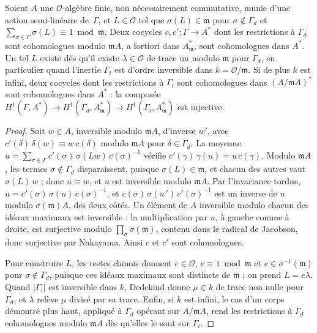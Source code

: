 \begin{encadre}
\begin{enonce}
Soient $A$ une $\mathcal O$-algèbre finie, non nécessairement commutative, munie d'une action semi-linéaire de~$\Gamma$, et $L \in \mathcal O$ tel que $\sigma(L) \in \mathfrak m$ pour $\sigma \notin \Gamma_d$ et $\sum_{\sigma \in \Gamma} \sigma(L) \equiv 1 \bmod \mathfrak m$. Deux cocycles $c, c' : \Gamma \to A^*$ dont les restrictions à $\Gamma_d$ sont cohomologues modulo $\mathfrak mA$, a fortiori dans $A_{\mathfrak m}^*$, sont cohomologues dans $A^*$. Un tel $L$ existe dès qu'il existe $\lambda \in \mathcal O$ de trace un modulo $\mathfrak m$ pour $\Gamma_d$, en particulier quand l'inertie $\Gamma_i$ est d'ordre inversible dans $k = \mathcal O/\mathfrak m$. Si de plus $k$ est infini, deux cocycles dont les restrictions à $\Gamma_i$ sont cohomologues dans $(A/\mathfrak mA)^*$ sont cohomologues dans $A^*$ : la composée $H^1(\Gamma, A^*) \to H^1(\Gamma_d, A_{\mathfrak m}^*) \to H^1(\Gamma_i, A_{\mathfrak m}^*)$ est injective.
\end{enonce}
\end{encadre}

\begin{proof}
Soit $w \in A$, inversible modulo $\mathfrak mA$, d'inverse $w'$, avec $c'(\delta)\,\delta(w) \equiv w\,c(\delta)$ modulo $\mathfrak mA$ pour $\delta \in \Gamma_d$. La moyenne $u = \sum_{\sigma \in \Gamma} c'(\sigma)\,\sigma(Lw)\,c(\sigma)^{-1}$ vérifie $c'(\gamma)\,\gamma(u) = u\,c(\gamma)$. Modulo $\mathfrak mA$, les termes $\sigma \notin \Gamma_d$ disparaissent, puisque $\sigma(L) \in \mathfrak m$, et chacun des autres vaut $\sigma(L)\,w$ ; donc $u \equiv w$, et $u$ est inversible modulo $\mathfrak mA$. Par l'invariance tordue, $u = c'(\sigma)\,\sigma(u)\,c(\sigma)^{-1}$, et $c(\sigma)\,\sigma(w')\,c'(\sigma)^{-1}$ est un inverse de $u$ modulo $\sigma(\mathfrak m)A$, des deux côtés. Un élément de $A$ inversible modulo chacun des idéaux maximaux est inversible : la multiplication par $u$, à gauche comme à droite, est surjective modulo $\prod_\sigma \sigma(\mathfrak m)$, contenu dans le radical de Jacobson, donc surjective par Nakayama. Ainsi $c$ et $c'$ sont cohomologues.

Pour construire $L$, les restes chinois donnent $e \in \mathcal O$, $e \equiv 1 \bmod \mathfrak m$ et $e \in \sigma^{-1}(\mathfrak m)$ pour $\sigma \notin \Gamma_d$, puisque ces idéaux maximaux sont distincts de $\mathfrak m$ ; on prend $L = e\lambda$. Quand $|\Gamma_i|$ est inversible dans $k$, Dedekind donne $\mu \in k$ de trace non nulle pour $\Gamma_d$, et $\lambda$ relève $\mu$ divisé par sa trace. Enfin, si $k$ est infini, le cas d'un corps démontré plus haut, appliqué à $\Gamma_d$ opérant sur $A/\mathfrak mA$, rend les restrictions à $\Gamma_d$ cohomologues modulo $\mathfrak mA$ dès qu'elles le sont sur $\Gamma_i$.
\end{proof}

